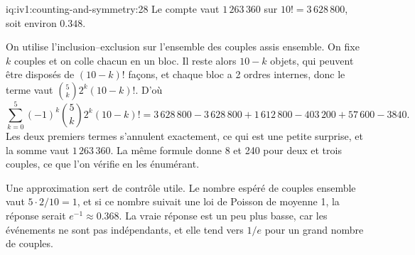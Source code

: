 \begin{solution}{iq:iv1:counting-and-symmetry:28}
Le compte vaut $1\,263\,360$ sur $10! = 3\,628\,800$, soit environ $0.348$.

On utilise l'inclusion--exclusion sur l'ensemble des couples assis ensemble. On fixe $k$ couples et on colle chacun en un bloc. Il reste alors $10 - k$ objets, qui peuvent être disposés de $(10 - k)!$ façons, et chaque bloc a 2 ordres internes, donc le terme vaut $\binom{5}{k} 2^k (10 - k)!$. D'où
\[
\sum_{k=0}^{5} (-1)^k \binom{5}{k} 2^k (10 - k)! = 3\,628\,800 - 3\,628\,800 + 1\,612\,800 - 403\,200 + 57\,600 - 3840.
\]
Les deux premiers termes s'annulent exactement, ce qui est une petite surprise, et la somme vaut $1\,263\,360$. La même formule donne 8 et 240 pour deux et trois couples, ce que l'on vérifie en les énumérant.

Une approximation sert de contrôle utile. Le nombre espéré de couples ensemble vaut $5 \cdot 2/10 = 1$, et si ce nombre suivait une loi de Poisson de moyenne 1, la réponse serait $e^{-1} \approx 0.368$. La vraie réponse est un peu plus basse, car les événements ne sont pas indépendants, et elle tend vers $1/e$ pour un grand nombre de couples.

\end{solution}


